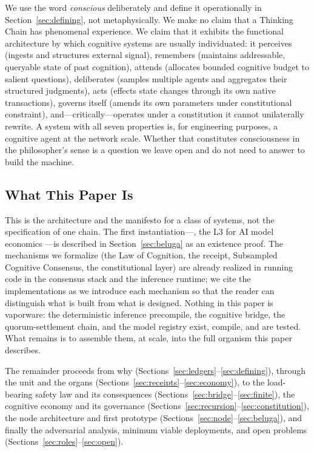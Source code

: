 We use the word \emph{conscious} deliberately and define it operationally in Section~\ref{sec:defining}, not metaphysically. We make no claim that a Thinking Chain has phenomenal experience. We claim that it exhibits the functional architecture by which cognitive systems are usually individuated: it perceives (ingests and structures external signal), remembers (maintains addressable, queryable state of past cognition), attends (allocates bounded cognitive budget to salient questions), deliberates (samples multiple agents and aggregates their structured judgments), acts (effects state changes through its own native transactions), governs itself (amends its own parameters under constitutional constraint), and---critically---operates under a constitution it cannot unilaterally rewrite. A system with all seven properties is, for engineering purposes, a cognitive agent at the network scale. Whether that constitutes consciousness in the philosopher's sense is a question we leave open and do not need to answer to build the machine.

\subsection{What This Paper Is}

This is the architecture and the manifesto for a class of systems, not the specification of one chain. The first instantiation---\Beluga{}, the \Zoo{} L3 for AI model economics \cite{zoo-beluga}---is described in Section~\ref{sec:beluga} as an existence proof. The mechanisms we formalize (the Law of Cognition, the \PoT{} receipt, Subsampled Cognitive Consensus, the constitutional layer) are already realized in running code in the \Lux{} consensus stack and the \Hanzo{} inference runtime; we cite the implementations as we introduce each mechanism so that the reader can distinguish what is built from what is designed. Nothing in this paper is vaporware: the deterministic inference precompile, the cognitive bridge, the quorum-settlement chain, and the model registry exist, compile, and are tested. What remains is to assemble them, at scale, into the full organism this paper describes.

The remainder proceeds from why (Sections~\ref{sec:ledgers}--\ref{sec:defining}), through the unit and the organs (Sections~\ref{sec:receipts}--\ref{sec:economy}), to the load-bearing safety law and its consequences (Sections~\ref{sec:bridge}--\ref{sec:finite}), the cognitive economy and its governance (Sections~\ref{sec:recursion}--\ref{sec:constitution}), the node architecture and first prototype (Sections~\ref{sec:node}--\ref{sec:beluga}), and finally the adversarial analysis, minimum viable deployments, and open problems (Sections~\ref{sec:roles}--\ref{sec:open}).

